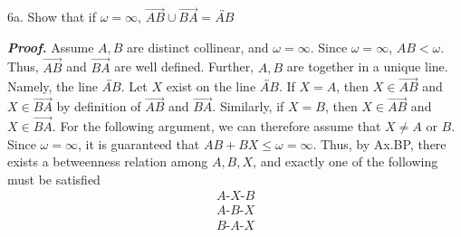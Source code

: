 \documentclass{report}
\title{\Huge{}}
\author{\huge{Nathan Warner}}
\date{\huge{}}
\begin{document}
    \pagebreak \bigbreak \noindent
    \begin{mdframed}
        6a. Show that if $\omega = \infty$, $\overrightarrow{AB} \cup \overrightarrow{BA} = \overleftrightarrow{AB} $
    \end{mdframed}
    \bigbreak \noindent 
    \textbf{\textit{Proof.}} Assume $A,B$ are distinct collinear, and $\omega = \infty$. Since $\omega = \infty$, $AB < \omega$. Thus, $ \overrightarrow{AB}$ and $\overrightarrow{BA}$ are well defined. Further, $A,B$ are together in a unique line. Namely, the line $\overleftrightarrow{AB}$.
    \bigbreak \noindent 
    Let $X$ exist on the line $\overleftrightarrow{AB}$. If $X = A$, then $X \in \overrightarrow{AB}$ and $X \in \overrightarrow{BA}$ by definition of $\overrightarrow{AB}$ and $\overrightarrow{BA}$. Similarly, if $X = B$, then $X \in \overrightarrow{AB}$ and $X \in \overrightarrow{BA}$. For the following argument, we can therefore  assume that $X \ne A$ or $B$.
    \bigbreak \noindent 
    Since $\omega = \infty$, it is guaranteed that $AB  +BX \leq \omega = \infty$. Thus, by Ax.BP, there exists a betweenness relation among $A,B,X$, and exactly one of the following must be satisfied
    \begin{align*}
        A\text{-}X\text{-}B \tag{1} \\
        A\text{-}B\text{-}X \tag{2} \\
        B\text{-}A\text{-}X \tag{3}
    \end{align*}
\end{document}
